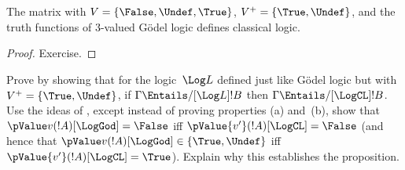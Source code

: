 \documentclass[../../../include/open-logic-section]{subfiles}
\begin{document}
\begin{prop}
  The matrix with $V = \{\False, \Undef,\True\}$, $V^+=\{\True,
  \Undef\}$, and the truth functions of $3$-valued G\"odel logic
  defines classical logic.
\end{prop}

\begin{proof}
  Exercise. 
\end{proof}

\begin{prob}
  Prove  by showing that for the
  logic~$\Log L$ defined just like G\"odel logic but with
  $V^+=\{\True,\Undef\}$, if $\Gamma \Entails/[\Log L] !B$ then
  $\Gamma \Entails/[\LogCL] !B$. Use the ideas of
  , except instead of proving
  properties (a) and~(b), show that $\pValue v(!A)[\LogGod] = \False$
  iff $\pValue {v'}(!A)[\LogCL] = \False$ (and hence that $\pValue
  v(!A)[\LogGod] \in \{\True,\Undef\}$ iff $\pValue {v'}(!A)[\LogCL] =
  \True$). Explain why this establishes the proposition.
\end{prob}
\end{document}
